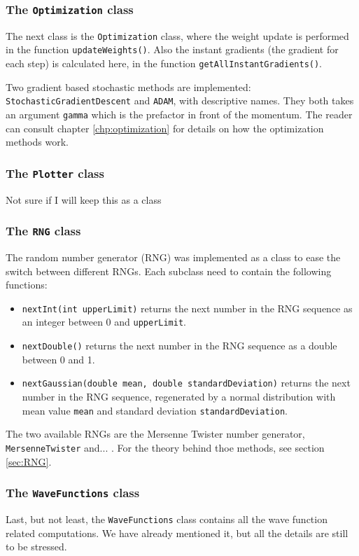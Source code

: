 \subsubsection{The \texttt{Optimization} class}
The next class is the \texttt{Optimization} class, where the weight update is performed in the function \texttt{updateWeights()}. Also the instant gradients (the gradient for each step) is calculated here, in the function \texttt{getAllInstantGradients()}.

Two gradient based stochastic methods are implemented: \texttt{StochasticGradientDescent} and \texttt{ADAM}, with descriptive names. They both takes an argument \texttt{gamma} which is the prefactor in front of the momentum. The reader can consult chapter \eqref{chp:optimization} for details on how the optimization methods work. 

\subsubsection{The \texttt{Plotter} class}
Not sure if I will keep this as a class

\subsubsection{The \texttt{RNG} class}
The random number generator (RNG) was implemented as a class to ease the switch between different RNGs. Each subclass need to contain the following functions:
\begin{itemize}
	\item \texttt{nextInt(int upperLimit)} returns the next number in the RNG sequence as an integer between 0 and \texttt{upperLimit}.
	
	\item \texttt{nextDouble()} returns the next number in the RNG sequence as a double between 0 and 1.
	
	\item \texttt{nextGaussian(double mean, double standardDeviation)} returns the next number in the RNG sequence, regenerated by a normal distribution with mean value \texttt{mean} and standard deviation \texttt{standardDeviation}.
\end{itemize}
The two available RNGs are the Mersenne Twister number generator, \texttt{MersenneTwister} and... . For the theory behind thoe methods, see section \eqref{sec:RNG}. 

\subsubsection{The \texttt{WaveFunctions} class}
Last, but not least, the \texttt{WaveFunctions} class contains all the wave function related computations. We have already mentioned it, but all the details are still to be stressed. 

